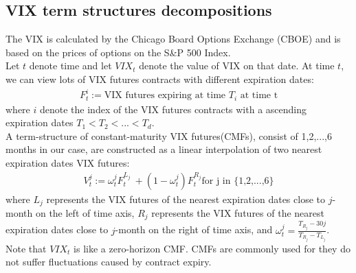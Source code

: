 \documentclass[10pt,letterpaper]{article}
\begin{document}
\subsection*{VIX term structures decompositions}
The VIX is calculated by the Chicago Board Options Exchange (CBOE) and is based on the prices of options on the S\&P 500 Index.
\\Let $t$ denote time and let $VIX_t$ denote the value of VIX on that date. At time $t$,
we can view lots of VIX futures contracts with different expiration dates:
\begin{eqnarray}
    {F^i_t} := \text{VIX futures expiring at time $T_i$ at time t}
\end{eqnarray}
where $i$ denote the index of the VIX futures contracts with a ascending expiration dates $T_1 < T_2 < ... < T_d$.
\\A term-structure of constant-maturity VIX futures(CMFs), consist of 1,2,...,6 months in our case, are constructed as
a linear interpolation of two nearest expiration dates VIX futures:
\begin{eqnarray}
\label{eq:defineV}
    {V^j_t} := \omega^j_tF^{L_j}_t\ + (1 - \omega^j_t)F^{R_j}_t \text{for j in \{1,2,...,6\}}
\end{eqnarray}
where $L_j$ represents the VIX futures of the nearest expiration dates close to $j$-month on the left of time axis,
$R_j$ represents the VIX futures of the nearest expiration dates close to $j$-month on the right of time axis, and
$\omega^j_t = \frac{T_{R_j} - 30j}{T_{R_j} - T_{L_j}}$. Note that $VIX_t$ is like a zero-horizon CMF.
CMFs are commonly used for they do not suffer fluctuations caused by contract expiry.
\end{document}

